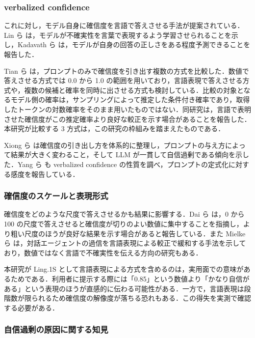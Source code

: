 \subsubsection{verbalized confidence}

これに対し，モデル自身に確信度を言語で答えさせる手法が提案されている．Lin ら \cite{lin2022teaching} は，モデルが不確実性を言葉で表現するよう学習させられることを示し，Kadavath ら \cite{kadavath2022know} は，モデルが自身の回答の正しさをある程度予測できることを報告した．

Tian ら \cite{tian2023justask} は，プロンプトのみで確信度を引き出す複数の方式を比較した．数値で答えさせる方式では 0.0 から 1.0 の範囲を用いており，言語表現で答えさせる方式や，複数の候補と確率を同時に出させる方式も検討している．比較の対象となるモデル側の確率は，サンプリングによって推定した条件付き確率であり，取得したトークンの対数確率をそのまま用いたものではない．同研究は，言語で表明させた確信度がこの推定確率より良好な較正を示す場合があることを報告した．本研究が比較する 3 方式は，この研究の枠組みを踏まえたものである．

Xiong ら \cite{xiong2024llmuncertainty} は確信度の引き出し方を体系的に整理し，プロンプトの与え方によって結果が大きく変わること，そして LLM が一貫して自信過剰である傾向を示した．Yang ら \cite{yang2024verbalizedscores} も verbalized confidence の性質を調べ，プロンプトの定式化に対する感度を報告している．

\subsubsection{確信度のスケールと表現形式}

確信度をどのような尺度で答えさせるかも結果に影響する．Dai ら \cite{dai2026rescaling} は，0 から 100 の尺度で答えさせると確信度が切りのよい数値に集中することを指摘し，より粗い尺度のほうが良好な結果を示す場合があると報告している．また Mielke ら \cite{mielke2022reducing} は，対話エージェントの過信を言語表現による較正で緩和する手法を示しており，数値ではなく言語で不確実性を伝える方向の研究もある．

本研究が Ling.1S として言語表現による方式を含めるのは，実用面での意味があるためである．利用者に提示する際には「0.85」という数値より「かなり自信がある」という表現のほうが直感的に伝わる可能性がある．一方で，言語表現は段階数が限られるため確信度の解像度が落ちる恐れもある．この得失を実測で確認する必要がある．

\subsubsection{自信過剰の原因に関する知見}

